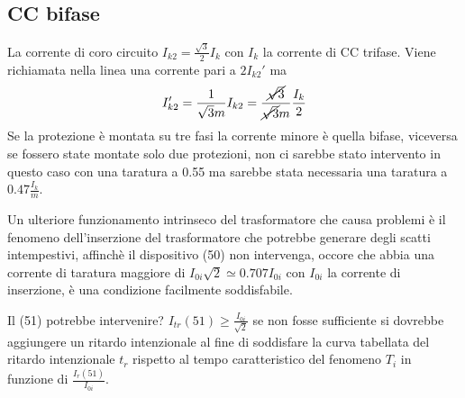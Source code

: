 \subsection{CC bifase}
La corrente di coro circuito $I_{k2}= \frac{\sqrt{3}}{2}I_k$ con $I_k$ la 
corrente di CC trifase.
Viene richiamata nella linea una corrente pari a $2I_{k2}'$ ma 
$$
I_{k2}' = \frac{1}{\sqrt{3}m} I_{k2} = \frac{\cancel{\sqrt{3}}}{\cancel{\sqrt{3}}m} \frac{I_k}{2}
$$
Se la protezione è montata su tre fasi la corrente minore è quella bifase, 
viceversa se fossero state montate solo due protezioni, non ci sarebbe stato 
intervento in questo caso con una taratura a 0.55 ma sarebbe stata necessaria 
una taratura a $0.47\frac{I_k}{m}$.

Un ulteriore funzionamento intrinseco del trasformatore che causa problemi è il 
fenomeno dell'inserzione del trasformatore che potrebbe generare degli scatti 
intempestivi, affinchè il dispositivo (50) non intervenga, occore che abbia una 
corrente di taratura maggiore di $I_{0i}{\sqrt{2}} \simeq 0.707 I_{0i}$ con $I_{0i}$ la corrente di inserzione, è una condizione facilmente soddisfabile.

Il (51) potrebbe intervenire?
$I_{tr}(51)\geq \frac{I_{0i}}{\sqrt{2}}$ se non fosse sufficiente si dovrebbe 
aggiungere un ritardo intenzionale al fine di soddisfare la curva tabellata del 
ritardo intenzionale $t_r$ rispetto al tempo caratteristico del fenomeno $T_i$ 
in funzione di $\frac{I_{r}(51)}{I_{0i}}$.

